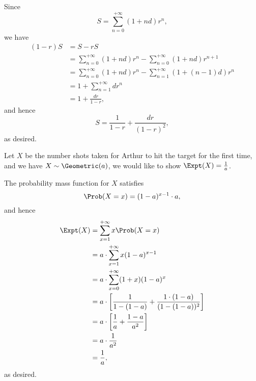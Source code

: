 \Question{\currfilebase}

Since
\[
    S = \sum_{n = 0}^{+\infty} (1 + nd) r^n,
\]
we have
\begin{align*}
    (1 - r)S & = S - rS                                                                          \\
             & = \sum_{n = 0}^{+\infty} (1 + nd) r^n - \sum_{n = 0}^{+\infty} (1 + nd) r^{n + 1} \\
             & = \sum_{n = 0}^{+\infty} (1 + nd) r^n - \sum_{n = 1}^{+\infty} (1 + (n - 1)d) r^n \\
             & = 1 + \sum_{n = 1}^{+\infty} d r^n                                                \\
             & = 1 + \frac{dr}{1 - r},
\end{align*}
and hence
\[
    S = \frac{1}{1 - r} + \frac{dr}{(1 - r)^2},
\]
as desired.

Let \(X\) be the number shots taken for Arthur to hit the target for the first time, and we have \(X \sim \Geometric(a)\), we would like to show \(\Expt(X) = \frac{1}{a}\).

The probability mass function for \(X\) satisfies
\[
    \Prob(X = x) = (1 - a)^{x - 1} \cdot a,
\]
and hence
\begin{align*}
    \Expt(X) & = \sum_{x = 1}^{+\infty} x \Prob(X = x)                                                \\
             & = a \cdot \sum_{x = 1}^{+\infty} x (1 - a)^{x - 1}                                     \\
             & = a \cdot \sum_{x = 0}^{+\infty} (1 + x) (1 - a)^{x}                                   \\
             & = a \cdot \left[\frac{1}{1 - (1 - a)} + \frac{1 \cdot (1 - a)}{(1 - (1 - a))^2}\right] \\
             & = a \cdot \left[\frac{1}{a} + \frac{1 - a}{a^2}\right]                                 \\
             & = a \cdot \frac{1}{a^2}                                                                \\
             & = \frac{1}{a},
\end{align*}
as desired.

